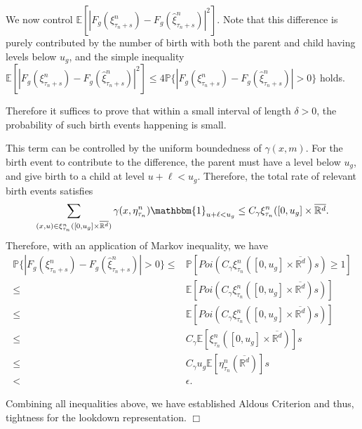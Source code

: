 \documentclass[12pt]{article}
\newenvironment {proof}{{\noindent\bf Proof }}{\hfill $\Box$ \medskip}
\def \hat{\widehat}
\begin{document}
\begin{proof}
We now control 
$\mathbb{E}[|F_g(\xi^n_{\tau_n + s})-F_g(\hat{\xi}^n_{\tau_n + s})|^2]$.
Note that this difference is purely contributed by the number of birth with both the parent and child having levels below $u_g$,
and the simple inequality 
$\mathbb{E}[|F_g(\xi^n_{\tau_n + s})-F_g(\hat{\xi}^n_{\tau_n + s})|^2] \leq 4 \mathbb{P}\{|F_g(\xi^n_{\tau_n + s})-F_g(\hat{\xi}^n_{\tau_n + s})|>0\}$
holds. 

Therefore it suffices to prove that within a small interval of length $\delta > 0$,
the probability of such birth events happening is small.

This term can be controlled by the uniform boundedness of $\gamma(x,m)$.
For the birth event to contribute to the difference, the parent must have a level below $u_g$, and give birth to a child at level $u + \ell < u_g$.
Therefore, the total rate of relevant birth events satisfies
\begin{equation}
\sum_{(x,u) \in \xi^n_{\tau_n}([0,u_g] \times \overline{\mathbb{R}^d})}  \gamma(x,\eta^n_{\tau_n}) \mathbbm{1}_{u+ \ell < u_g }
\leq C_{\gamma} \xi^n_{\tau_n}([0,u_g] \times \overline{\mathbb{R}^d}.
\end{equation}
Therefore, with an application of Markov inequality, 
we have
\begin{equation}
\begin{aligned}
\mathbb{P}\{|F_g(\xi^n_{\tau_n + s})-F_g(\hat{\xi}^n_{\tau_n + s})|>0\}
\leq & \mathbb{P}[Poi(C_{\gamma} \xi^n_{\tau_n}([0,u_g] \times \overline{\mathbb{R}^d})s) \geq  1]\\
\leq & \mathbb{E}[Poi(C_{\gamma} \xi^n_{\tau_n}([0,u_g] \times \overline{\mathbb{R}^d})s)]\\
\leq & \mathbb{E}[Poi(C_{\gamma} \xi^n_{\tau_n}([0,u_g] \times \overline{\mathbb{R}^d})s)]\\
\leq & C_{\gamma}  \mathbb{E}[\xi^n_{\tau_n}([0,u_g] \times \overline{\mathbb{R}^d})]s\\
\leq & C_{\gamma}  u_g\mathbb{E}[\eta^n_{\tau_n}(\overline{\mathbb{R}^d})]s\\
<&  \epsilon.
\end{aligned}
\end{equation}

Combining all inequalities above, we have established Aldous Criterion and thus, tightness for the lookdown representation. 
\end{proof}





\end{document}
